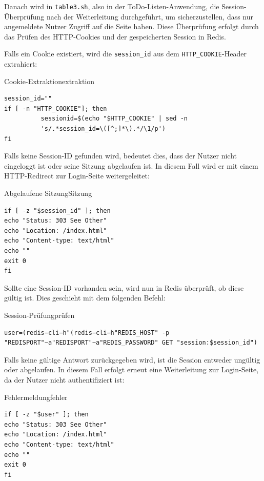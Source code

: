 Danach wird in \texttt{table3.sh}, also in der ToDo-Listen-Anwendung, die Session-Überprüfung nach der Weiterleitung durchgeführt, um sicherzustellen, dass nur angemeldete Nutzer Zugriff auf die Seite haben. Diese Überprüfung erfolgt durch das Prüfen des HTTP-Cookies und der gespeicherten Session in Redis.

Falls ein Cookie existiert, wird die \texttt{session\_id} aus dem \texttt{HTTP\_COOKIE}-Header extrahiert:
\begin{code}{Cookie-Extraktion}{extraktion}
        \begin{verbatim}
session_id=""
if [ -n "HTTP_COOKIE"]; then
          sessionid=$(echo "$HTTP_COOKIE" | sed -n 
          's/.*session_id=\([^;]*\).*/\1/p')
fi
  \end{verbatim}
\end{code}

Falls keine Session-ID gefunden wird, bedeutet dies, dass der Nutzer nicht eingeloggt ist oder seine Sitzung abgelaufen ist. In diesem Fall wird er mit einem HTTP-Redirect zur Login-Seite weitergeleitet:

\begin{code}{Abgelaufene Sitzung}{Sitzung}
        \begin{verbatim}
if [ -z "$session_id" ]; then
echo "Status: 303 See Other"
echo "Location: /index.html"
echo "Content-type: text/html"
echo ""
exit 0
fi
  \end{verbatim}
\end{code}

Sollte eine Session-ID vorhanden sein, wird nun in Redis überprüft, ob diese gültig ist. Dies geschieht mit dem folgenden Befehl:

\begin{code}{Session-Prüfung}{prüfen}
        \begin{verbatim}
user=(redis−cli−h"(redis−cli−h"REDIS_HOST" -p "REDISPORT"−a"REDISPORT"−a"REDIS_PASSWORD" GET "session:$session_id")
  \end{verbatim}
\end{code}

Falls keine gültige Antwort zurückgegeben wird, ist die Session entweder ungültig oder abgelaufen. In diesem Fall erfolgt erneut eine Weiterleitung zur Login-Seite, da der Nutzer nicht authentifiziert ist:

\begin{code}{Fehlermeldung}{fehler}
        \begin{verbatim}
if [ -z "$user" ]; then
echo "Status: 303 See Other"
echo "Location: /index.html"
echo "Content-type: text/html"
echo ""
exit 0
fi
  \end{verbatim}
\end{code}


